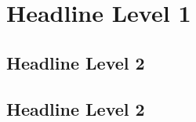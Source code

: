 \section{Headline Level 1}
\lipsum[1]
\subsection{Headline Level 2}
\lipsum[1]
\subsection{Headline Level 2}
\lipsum[1]
